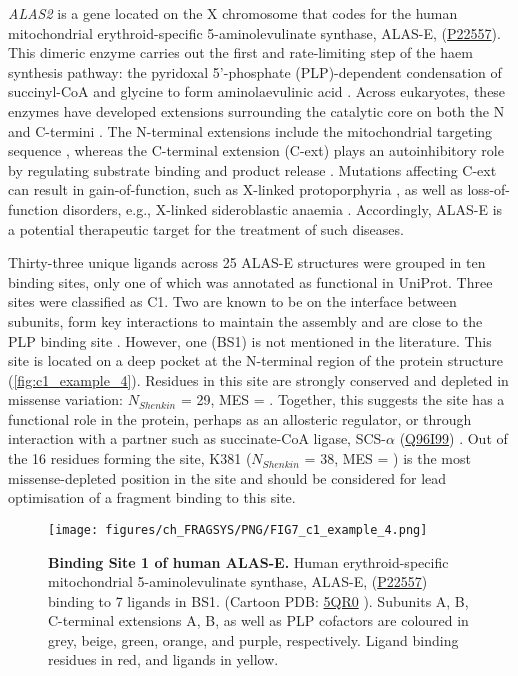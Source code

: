 \textit{ALAS2} is a gene located on the X chromosome that codes for the human mitochondrial erythroid-specific 5-aminolevulinate synthase, ALAS-E, (\href{https://www.uniprot.org/uniprotkb/P22557/entry}{P22557}). This dimeric enzyme carries out the first and rate-limiting step of the haem synthesis pathway: the pyridoxal 5’-phosphate (PLP)-dependent condensation of succinyl-CoA and glycine to form aminolaevulinic acid \cite{AKHTAR_1976_PORPHYRIN}. Across eukaryotes, these enzymes have developed extensions surrounding the catalytic core on both the N and C-termini \cite{MUNAKATA_1993_AMINOLEVULINATE}. The N-terminal extensions include the mitochondrial targeting sequence \cite{SRIVASTAVA_1988_AMINOLEVULINATE}, whereas the C-terminal extension (C-ext) plays an autoinhibitory role by regulating substrate binding and product release \cite{BAILEY_2020_AMINOLEVULINATE}. Mutations affecting C-ext can result in gain-of-function, such as X-linked protoporphyria \cite{WHATLEY_2008_AMINOLEVULINATE}, as well as loss-of-function disorders, e.g., X-linked sideroblastic anaemia \cite{DUCAMP_2011_SIDEROBLASTIC}. Accordingly, ALAS-E is a potential therapeutic target for the treatment of such diseases.

Thirty-three unique ligands across 25 ALAS-E structures were grouped in ten binding sites, only one of which was annotated as functional in UniProt. Three sites were classified as C1. Two are known to be on the interface between subunits, form key interactions to maintain the assembly and are close to the PLP binding site \cite{BAILEY_2020_AMINOLEVULINATE}. However, one (BS1) is not mentioned in the literature. This site is located on a deep pocket at the N-terminal region of the protein structure (\autoref{fig:c1_example_4}). Residues in this site are strongly conserved and depleted in missense variation: $N_{Shenkin}$ = 29, MES = . Together, this suggests the site has a functional role in the protein, perhaps as an allosteric regulator, or through interaction with a partner such as succinate-CoA ligase, SCS-$\alpha$ (\href{https://www.uniprot.org/uniprotkb/Q96I99/entry}{Q96I99}) \cite{FURUYAMA_2000_SIDEROBLASTIC}. Out of the 16 residues forming the site, K381 ($N_{Shenkin}$ = 38, MES = ) is the most missense-depleted position in the site and should be considered for lead optimisation of a fragment binding to this site.

\begin{figure}[htb!]
    \centering
    \texttt{[image: figures/ch\_FRAGSYS/PNG/FIG7\_c1\_example\_4.png]}
    \caption[Binding Site 1 of human ALAS-E]{\textbf{Binding Site 1 of human ALAS-E.} Human erythroid-specific mitochondrial 5-amino\-levulinate synthase, ALAS-E, (\href{https://www.uniprot.org/uniprotkb/P22557/entry}{P22557}) binding to 7 ligands in BS1. (Cartoon PDB: \href{https://www.ebi.ac.uk/pdbe/entry/pdb/5qr0}{5QR0} \cite{PDB_5QR0}). Subunits A, B, C-terminal extensions A, B, as well as PLP cofactors are coloured in grey, beige, green, orange, and purple, respectively. Ligand binding residues in red, and ligands in yellow.}
    \label{fig:c1_example_4}
\end{figure}

